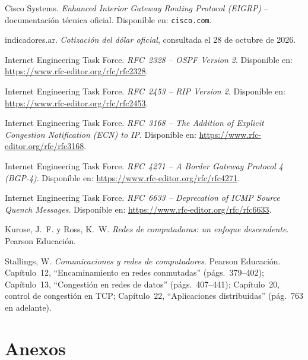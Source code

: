 \documentclass[11pt,a4paper]{article}
\begin{document}
\begin{enumerate}[leftmargin=1.3cm, label={[\arabic*]}, itemsep=0.3cm]
  \item Cisco Systems. \textit{Enhanced Interior Gateway Routing Protocol (EIGRP)} -- documentaci\'on t\'ecnica oficial. Dispon\'ible en: \texttt{cisco.com}.

  \item indicadores.ar. \textit{Cotizaci\'on del d\'olar oficial}, consultada el 28 de octubre de 2026.

  \item Internet Engineering Task Force. \textit{RFC~2328 -- OSPF Version 2}. Dispon\'ible en: \url{https://www.rfc-editor.org/rfc/rfc2328}.

  \item Internet Engineering Task Force. \textit{RFC~2453 -- RIP Version 2}. Dispon\'ible en: \url{https://www.rfc-editor.org/rfc/rfc2453}.

  \item Internet Engineering Task Force. \textit{RFC~3168 -- The Addition of Explicit Congestion Notification (ECN) to IP}. Dispon\'ible en: \url{https://www.rfc-editor.org/rfc/rfc3168}.

  \item Internet Engineering Task Force. \textit{RFC~4271 -- A Border Gateway Protocol 4 (BGP-4)}. Dispon\'ible en: \url{https://www.rfc-editor.org/rfc/rfc4271}.

  \item Internet Engineering Task Force. \textit{RFC~6633 -- Deprecation of ICMP Source Quench Messages}. Dispon\'ible en: \url{https://www.rfc-editor.org/rfc/rfc6633}.

  \item Kurose, J.~F. y Ross, K.~W. \textit{Redes de computadoras: un enfoque descendente}. Pearson Educaci\'on.

  \item Stallings, W. \textit{Comunicaciones y redes de computadores}. Pearson Educaci\'on. Cap\'itulo~12, ``Encaminamiento en redes conmutadas'' (p\'ags.~379--402); Cap\'itulo~13, ``Congesti\'on en redes de datos'' (p\'ags.~407--441); Cap\'itulo~20, control de congesti\'on en TCP; Cap\'itulo~22, ``Aplicaciones distribuidas'' (p\'ag.~763 en adelante).
\end{enumerate}

\clearpage
\section*{Anexos}
\label{sec:anexos}
\end{document}
